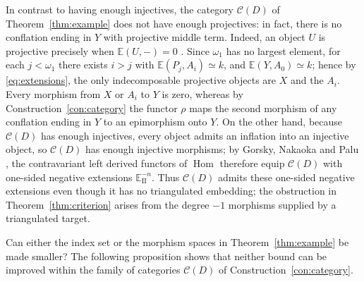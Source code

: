 \documentclass[a4paper,reqno,10pt]{amsart}
\numberwithin{equation}{section}
\theoremstyle{definition}
\newcommand{\C}{\mathcal C}
\newcommand{\E}{\mathbb E}
\DeclareMathOperator{\Hom}{Hom}
\begin{document}
In contrast to having enough injectives, the category $\C(D)$ of
Theorem~\ref{thm:example} does not have enough projectives: in fact, there is
no conflation ending in $Y$ with projective middle term. Indeed, an object $U$
is projective precisely when $\E(U,-)=0$ \cite[Proposition~3.24]{NP}. Since
$\omega_1$ has no largest element, for each $j<\omega_1$ there exists $i>j$
with $\E(P_j,A_i)\simeq k$, and $\E(Y,A_0)\simeq k$; hence by
\eqref{eq:extensions}, the only indecomposable projective objects are $X$ and
the $A_i$. Every morphism from $X$ or $A_i$ to $Y$ is zero, whereas by
Construction~\ref{con:category} the functor $\rho$ maps the second morphism of
any conflation ending in $Y$ to an epimorphism onto $Y$. On the other hand,
because $\C(D)$ has enough injectives, every object admits an inflation into an
injective object, so $\C(D)$ has enough injective morphisms; by Gorsky, Nakaoka
and Palu \cite[Corollary~5.22]{GNP}, the contravariant left derived functors of
$\Hom$ therefore equip $\C(D)$ with one-sided negative extensions
$\E_{\mathrm{II}}^{-n}$. Thus $\C(D)$ admits these one-sided negative
extensions even though it has no triangulated embedding; the obstruction in
Theorem~\ref{thm:criterion} arises from the degree $-1$ morphisms supplied by a
triangulated target.

Can either the index set or the morphism spaces in Theorem~\ref{thm:example} be
made smaller? The following proposition shows that neither bound can be
improved within the family of categories $\C(D)$ of
Construction~\ref{con:category}.
\end{document}
